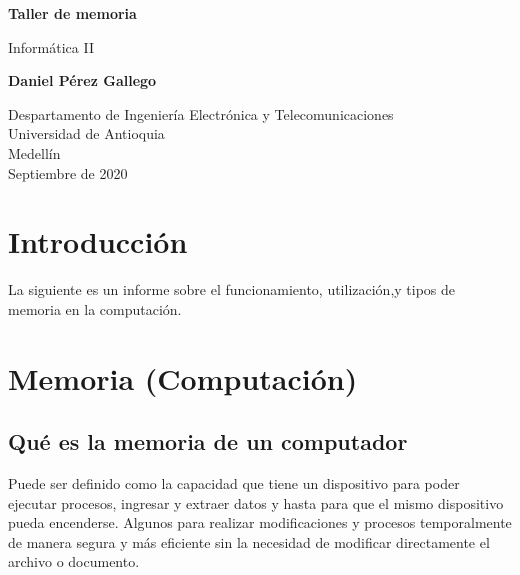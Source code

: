 \documentclass{article}
\begin{document}
\begin{titlepage}
    \begin{center}
        \vspace*{1cm}
            
        \Huge
        \textbf{Taller de memoria}
            
        \vspace{0.5cm}
        \LARGE
        Informática II
            
        \vspace{1.5cm}
            
        \textbf{Daniel Pérez Gallego}
            
        \vfill
            
        \vspace{0.8cm}
            
        \Large
        Despartamento de Ingeniería Electrónica y Telecomunicaciones\\
        Universidad de Antioquia\\
        Medellín\\
        Septiembre de 2020
            
    \end{center}
\end{titlepage}

\tableofcontents

\section{Introducción}
La siguiente es un informe sobre el funcionamiento, utilización,y tipos de memoria  en la computación.
\vspace{12 cm}
\section{Memoria (Computación)} \label{contenido}

\subsection{Qué es la memoria de un computador}
Puede ser definido como la capacidad que tiene un dispositivo para poder ejecutar procesos,  ingresar y extraer datos y hasta para que el mismo dispositivo pueda encenderse.
Algunos para realizar modificaciones y procesos temporalmente de manera segura y más eficiente sin la necesidad de modificar directamente el archivo o documento.
\vspace{0,5 cm}
\end{document}
